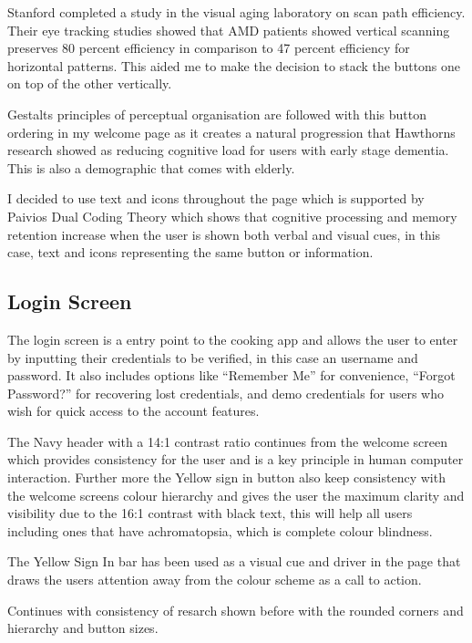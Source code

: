\documentclass[]{project_final}
\begin{document}
Stanford completed a study in the visual aging laboratory on scan path efficiency. Their eye tracking studies showed that AMD patients showed vertical scanning preserves 80 percent efficiency in comparison to 47 percent efficiency for horizontal patterns. This aided me to make the decision to stack the buttons one on top of the other vertically.

Gestalts principles of perceptual organisation  are followed with this button ordering in my welcome page as it creates a natural progression that Hawthorns research showed as reducing cognitive load for users with early stage dementia. This is also a demographic that comes with elderly.


I decided to use text and icons throughout the page which is supported by Paivios Dual Coding Theory which shows that cognitive processing and memory retention increase when the user is shown both verbal and visual cues, in this case, text and icons representing the same button or information.


\subsection{Login Screen}
The login screen is a entry point to the cooking app and allows the user to enter by inputting their credentials to be verified, in this case an username and password. It also includes options like “Remember Me” for convenience, “Forgot Password?” for recovering lost credentials, and demo credentials for users who wish for quick access to the account features.

The Navy header with a 14:1 contrast ratio continues from the welcome screen which provides consistency for the user and is a key principle in human computer interaction.
Further more the Yellow sign in button also keep consistency with the welcome screens colour hierarchy and gives the user the maximum clarity and visibility due to the 16:1 contrast with black text, this will help all users including ones that have achromatopsia, which is complete colour blindness.

The Yellow Sign In bar has been used as a visual cue and driver in the page that draws the users attention away from the colour scheme as a call to action.

Continues with consistency of resarch shown before with the rounded corners and hierarchy and button sizes.
\end{document}
